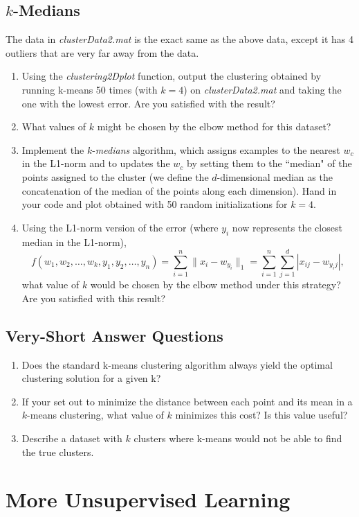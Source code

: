 \documentclass{article}
\def\blu#1{{\color{blu}#1}}
\def\norm#1{\|#1\|}
\def\enum#1{\begin{enumerate}#1\end{enumerate}}
\begin{document}
 \subsection{$k$-Medians}
 
 The data in \emph{clusterData2.mat} is the exact same as the above data, except it has 4 outliers that are very far away from the data.
 
 \blu{\enum{
 \item Using the \emph{clustering2Dplot} function, output the clustering obtained by running k-means 50 times (with $k=4$) on \emph{clusterData2.mat} and taking the one with the lowest error. Are you satisfied with the result?
 \item What values of $k$ might be chosen by the elbow method for this dataset?
 \item Implement the $k$-\emph{medians} algorithm, which assigns examples to the nearest $w_c$ in the L1-norm and to updates the $w_c$ by setting them to the ``median" of the points assigned to the cluster (we define the $d$-dimensional median as the concatenation of the median of the points along each dimension). Hand in your code and plot obtained with 50 random initializations for $k = 4$.
\item Using the L1-norm version of the error (where $y_i$ now represents the closest median in the L1-norm),
\[
f(w_1,w_2,\dots,w_k,y_1,y_2,\dots,y_n) = \sum_{i=1}^n \norm{x_i - w_{y_i}}_1 = \sum_{i=1}^n \sum_{j=1}^d |x_{ij} - w_{y_ij}|,
\]
what value of $k$ would be chosen by the elbow method under this strategy? Are you satisfied with this result?
}
}

\subsection{Very-Short Answer Questions}

\blu{
\enum{
\item Does the standard k-means clustering algorithm always yield the optimal clustering solution for a given k?
\item If your set out to minimize the distance between each point and its mean in a $k$-means clustering, what value of $k$ minimizes this cost? Is this value useful?
\item Describe a dataset with $k$ clusters where k-means would not be able to find the true clusters.
}}


\section{More Unsupervised Learning}
\end{document}
